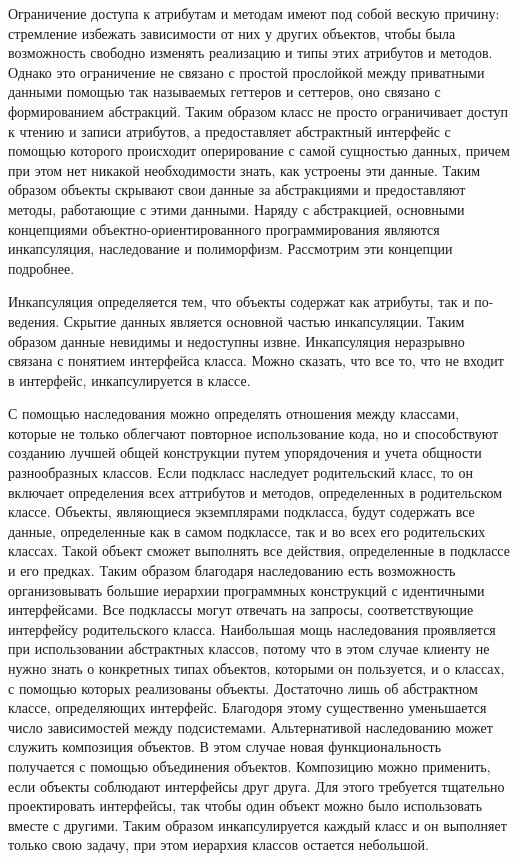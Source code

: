 \documentclass[russian,utf8,simple,hpadding=10mm,vpadding=20mm]{eskdtext}
\begin{document}
Ограничение доступа к атрибутам и методам имеют под собой вескую причину: стремление избежать зависимости от них у других объектов, чтобы была возможность свободно изменять реализацию и типы этих атрибутов и методов.  Однако это ограничение не связано с простой прослойкой  между приватными данными  помощью так называемых геттеров и сеттеров, оно связано с формированием абстракций. Таким образом класс не просто ограничивает доступ к чтению и записи атрибутов,  а предоставляет  абстрактный интерфейс с помощью которого происходит оперирование с самой сущностью данных, причем при этом нет никакой необходимости знать, как устроены эти данные. Таким образом объекты скрывают свои данные за абстракциями и предоставляют методы, работающие с этими данными. Наряду с абстракцией, основными концепциями объектно-ориентированного программирования являются инкапсуляция, наследование и полиморфизм. Рассмотрим эти концепции подробнее.

Инкапсуляция определяется тем, что объекты содержат как атрибуты, так и по-
ведения. Скрытие данных является основной частью инкапсуляции. Таким образом
данные невидимы и недоступны извне.  Инкапсуляция неразрывно связана с понятием интерфейса класса. Можно сказать, что все то, что не входит в интерфейс, инкапсулируется в классе.

С помощью наследования можно определять отношения между классами, которые не только облегчают повторное использование кода, но и способствуют созданию лучшей общей конструкции путем упорядочения и учета общности разнообразных классов.
Если подкласс наследует родительский класс, то он включает определения всех
аттрибутов и методов, определенных в родительском классе. Объекты, являющиеся экземплярами подкласса, будут содержать все данные, определенные как в самом подклассе, так и во всех его родительских классах. Такой объект сможет выполнять все действия, определенные в подклассе и его предках. Таким образом благодаря наследованию есть возможность организовывать большие иерархии программных конструкций с идентичными интерфейсами. Все
подклассы могут отвечать на запросы, соответствующие интерфейсу родительского класса. Наибольшая мощь наследования проявляется при использовании абстрактных классов, потому что в этом случае клиенту не нужно знать о конкретных типах объектов, которыми он пользуется,  и о классах, с помощью которых реализованы объекты. Достаточно лишь об абстрактном классе, определяющих интерфейс. Благодоря этому существенно уменьшается число зависимостей между подсистемами. Альтернативой наследованию может служить композиция объектов. В этом случае новая функциональность получается с помощью объединения объектов. Композицию можно применить, если объекты соблюдают интерфейсы друг друга. Для этого требуется тщательно проектировать интерфейсы, так чтобы один объект можно было использовать вместе с другими. Таким образом инкапсулируется каждый класс и он выполняет только свою задачу, при этом иерархия классов остается небольшой.
\end{document}
